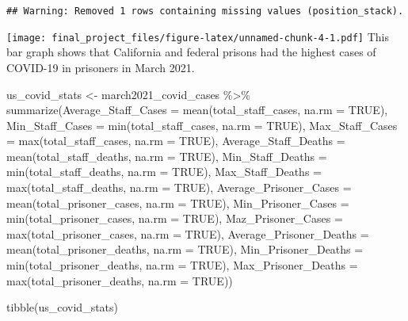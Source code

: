 \documentclass[
]{article}
\newenvironment{Shaded}{\begin{snugshade}}{\end{snugshade}}
\newcommand{\AttributeTok}[1]{\textcolor[rgb]{0.77,0.63,0.00}{#1}}
\newcommand{\ConstantTok}[1]{\textcolor[rgb]{0.00,0.00,0.00}{#1}}
\newcommand{\FunctionTok}[1]{\textcolor[rgb]{0.00,0.00,0.00}{#1}}
\newcommand{\NormalTok}[1]{#1}
\newcommand{\OtherTok}[1]{\textcolor[rgb]{0.56,0.35,0.01}{#1}}
\newcommand{\SpecialCharTok}[1]{\textcolor[rgb]{0.00,0.00,0.00}{#1}}
\begin{document}
\begin{verbatim}
## Warning: Removed 1 rows containing missing values (position_stack).
\end{verbatim}

\texttt{[image: final\_project\_files/figure-latex/unnamed-chunk-4-1.pdf]}
This bar graph shows that California and federal prisons had the highest
cases of COVID-19 in prisoners in March 2021.

\begin{Shaded}
\begin{Highlighting}[]
\NormalTok{us\_covid\_stats }\OtherTok{\textless{}{-}}\NormalTok{ march2021\_covid\_cases }\SpecialCharTok{\%\textgreater{}\%}
  \FunctionTok{summarize}\NormalTok{(}\AttributeTok{Average\_Staff\_Cases =} \FunctionTok{mean}\NormalTok{(total\_staff\_cases, }\AttributeTok{na.rm =} \ConstantTok{TRUE}\NormalTok{),}
            \AttributeTok{Min\_Staff\_Cases =} \FunctionTok{min}\NormalTok{(total\_staff\_cases, }\AttributeTok{na.rm =} \ConstantTok{TRUE}\NormalTok{),}
            \AttributeTok{Max\_Staff\_Cases =} \FunctionTok{max}\NormalTok{(total\_staff\_cases, }\AttributeTok{na.rm =} \ConstantTok{TRUE}\NormalTok{),}
            \AttributeTok{Average\_Staff\_Deaths =} \FunctionTok{mean}\NormalTok{(total\_staff\_deaths, }\AttributeTok{na.rm =} \ConstantTok{TRUE}\NormalTok{),}
            \AttributeTok{Min\_Staff\_Deaths =} \FunctionTok{min}\NormalTok{(total\_staff\_deaths, }\AttributeTok{na.rm =} \ConstantTok{TRUE}\NormalTok{),}
            \AttributeTok{Max\_Staff\_Deaths =} \FunctionTok{max}\NormalTok{(total\_staff\_deaths, }\AttributeTok{na.rm =} \ConstantTok{TRUE}\NormalTok{),}
            \AttributeTok{Average\_Prisoner\_Cases =} \FunctionTok{mean}\NormalTok{(total\_prisoner\_cases, }\AttributeTok{na.rm =} \ConstantTok{TRUE}\NormalTok{),}
            \AttributeTok{Min\_Prisoner\_Cases =} \FunctionTok{min}\NormalTok{(total\_prisoner\_cases, }\AttributeTok{na.rm =} \ConstantTok{TRUE}\NormalTok{),}
            \AttributeTok{Maz\_Prisoner\_Cases =} \FunctionTok{max}\NormalTok{(total\_prisoner\_cases, }\AttributeTok{na.rm =} \ConstantTok{TRUE}\NormalTok{),}
            \AttributeTok{Average\_Prisoner\_Deaths =} \FunctionTok{mean}\NormalTok{(total\_prisoner\_deaths, }\AttributeTok{na.rm =} \ConstantTok{TRUE}\NormalTok{),}
            \AttributeTok{Min\_Prisoner\_Deaths =} \FunctionTok{min}\NormalTok{(total\_prisoner\_deaths, }\AttributeTok{na.rm =} \ConstantTok{TRUE}\NormalTok{),}
            \AttributeTok{Max\_Prisoner\_Deaths =} \FunctionTok{max}\NormalTok{(total\_prisoner\_deaths, }\AttributeTok{na.rm =} \ConstantTok{TRUE}\NormalTok{))}

\FunctionTok{tibble}\NormalTok{(us\_covid\_stats)}
\end{Highlighting}
\end{Shaded}
\end{document}
